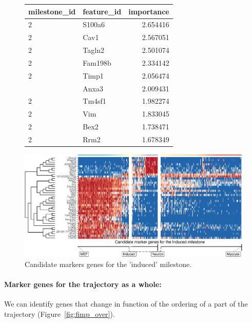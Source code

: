 \begin{figure}
	{\footnotesize
\begin{tabular}{llr}
\toprule
milestone\_id & feature\_id & importance\\
\midrule
2 & S100a6 & 2.654416\\
2 & Cav1 & 2.567051\\
2 & Tagln2 & 2.501074\\
2 & Fam198b & 2.334142\\
2 & Timp1 & 2.056474\\
\addlinespace
2 & Anxa3 & 2.009431\\
2 & Tm4sf1 & 1.982274\\
2 & Vim & 1.833045\\
2 & Bex2 & 1.738471\\
2 & Rrm2 & 1.678349\\
\bottomrule
\end{tabular}
}
\includegraphics[width=.6\linewidth,valign=m]{manuscript_files/figure-latex/milestoneimpheatmap-1.pdf}
\caption{Candidate markers genes for the 'induced' milestone.}
\label{fig:fimp_mil}
\end{figure}


\paragraph{Marker genes for the trajectory as a whole:}
We can identify genes that change in function of the ordering of a part
of the trajectory (Figure~\ref{fig:fimp_over}).

